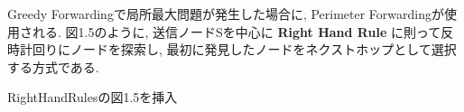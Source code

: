 Greedy Forwardingで局所最大問題が発生した場合に, 
Perimeter Forwardingが使用される. 
図1.5のように, 送信ノードSを中心に
\textbf{Right Hand Rule} に則って反時計回りにノードを探索し, 
最初に発見したノードをネクストホップとして選択する方式である.

{\LARGE RightHandRulesの図1.5を挿入}